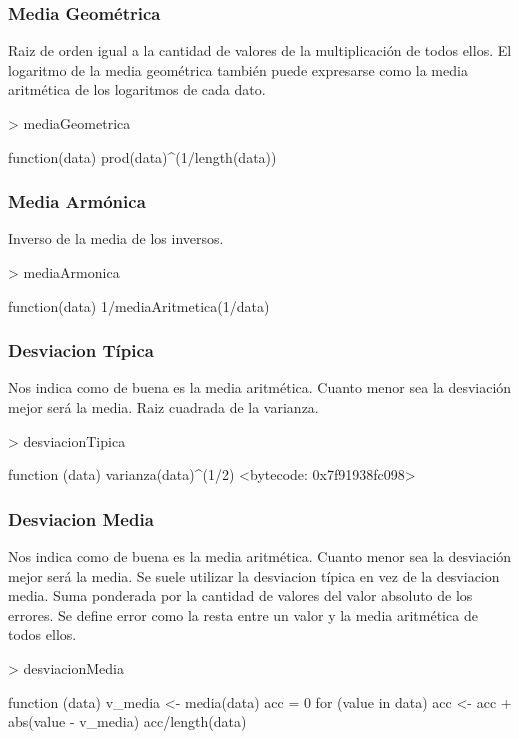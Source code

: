 \documentclass [a4paper] {article}
\begin{document}
\subsubsection{Media Geométrica}
Raiz de orden igual a la cantidad de valores de la multiplicación de todos ellos.
El logaritmo de la media geométrica también puede expresarse como la media aritmética de los logaritmos de cada dato.
\begin{Schunk}
\begin{Sinput}
> mediaGeometrica
\end{Sinput}
\begin{Soutput}
function(data){
  prod(data)^(1/length(data))
}
\end{Soutput}
\end{Schunk}
\subsubsection{Media Armónica}
Inverso de la media de los inversos.
\begin{Schunk}
\begin{Sinput}
> mediaArmonica
\end{Sinput}
\begin{Soutput}
function(data){
  1/mediaAritmetica(1/data)
}
\end{Soutput}
\end{Schunk}
\subsubsection{Desviacion Típica}
Nos indica como de buena es la media aritmética. Cuanto menor sea la desviación mejor será la media.
Raiz cuadrada de la varianza.
\begin{Schunk}
\begin{Sinput}
> desviacionTipica
\end{Sinput}
\begin{Soutput}
function (data) {
  varianza(data)^(1/2)
}
<bytecode: 0x7f91938fc098>
\end{Soutput}
\end{Schunk}
\subsubsection{Desviacion Media}
Nos indica como de buena es la media aritmética. Cuanto menor sea la desviación mejor será la media.
Se suele utilizar la desviacion típica en vez de la desviacion media.
Suma ponderada por la cantidad de valores del valor absoluto de los errores.
Se define error como la resta entre un valor y la media aritmética de todos ellos.
\begin{Schunk}
\begin{Sinput}
> desviacionMedia
\end{Sinput}
\begin{Soutput}
function (data){
  v_media <- media(data)
  acc = 0
  for (value in data){
    acc <- acc + abs(value - v_media)
  }
  acc/length(data)
}
\end{Soutput}
\end{Schunk}
\end{document}
